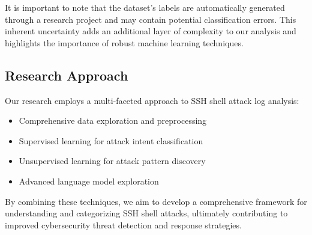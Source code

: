         It is important to note that the dataset's labels are automatically generated through a research project and may contain potential classification errors. This inherent uncertainty adds an additional layer of complexity to our analysis and highlights the importance of robust machine learning techniques.

    \subsection{Research Approach}
    
        Our research employs a multi-faceted approach to SSH shell attack log analysis:

        \begin{itemize}
            \item Comprehensive data exploration and preprocessing
            \item Supervised learning for attack intent classification
            \item Unsupervised learning for attack pattern discovery
            \item Advanced language model exploration
        \end{itemize}

        By combining these techniques, we aim to develop a comprehensive framework for understanding and categorizing SSH shell attacks, ultimately contributing to improved cybersecurity threat detection and response strategies.

